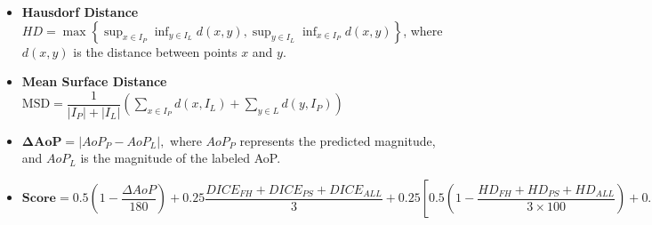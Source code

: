 \begin{frame}
\begin{itemize}
    \item  \textbf{Hausdorf  Distance}
    $H D=\max \left\{\sup _{x \in  I_P} \inf _{y \in I_L} d(x, y), \sup _{y \in I_L} \inf _{x \in I_P} d(x, y)\right\}$,
    where $d(x, y)$ is the distance between points $x$ 
    and $y$. 
    \item  \textbf{Mean Surface Distance} 
    $\mathrm{MSD}=\dfrac{1}{\left|I_P\right|+\left|I_L\right|}\left(\sum_{x \in I_P} d\left(x, I_L\right)+\sum_{y \in L} d\left(y, I_P\right)\right)$

    \item $\mathbf{\Delta A o P}=\left|A o P_P-A o P_L\right|,$
    where $A o P_P$ represents the predicted magnitude, 
    and $A o P_L$ is the magnitude of the labeled AoP. 
    
    \item $\mathbf{Score} = 0.5\left(1-\dfrac{\Delta AoP}{180}\right)+
    0.25\dfrac{DICE_{FH}+DICE_{PS}+DICE_{ALL}}{3}+
    0.25\left[0.5 \left(1- \dfrac{HD_{FH}+HD_{PS}+HD_{ALL}}{3 \times 100} \right)+
    0.5 \left(1- \dfrac{MSD_{FH}+MSD_{PS}+MSD_{ALL}}{3 \times 100} \right)\right]$
\end{itemize}
\end{frame}

